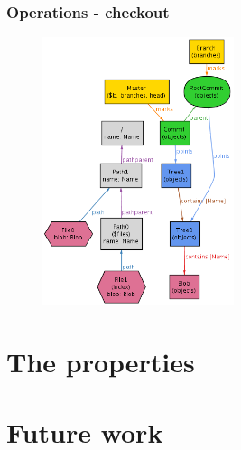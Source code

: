 \documentclass{beamer}
\begin{document}
\begin{frame}[fragile]
   \frametitle{Operations - checkout}
      \begin{figure}
         \centering
         \includegraphics[width=0.50\textwidth]{images/checkout2.png}
      \end{figure}
\end{frame}

\section{The properties}
\section{Future work}

\frame{
   \titlepage
}
\end{document}
